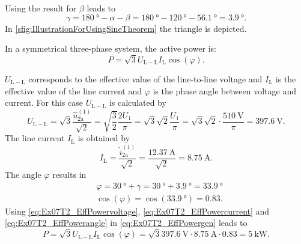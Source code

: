 \begin{solutionblock}
    Using the result for $\beta$ leads to
    \begin{equation}
        \gamma=\SI{180}{\degree}-\alpha-\beta = \SI{180}{\degree}-\SI{120}{\degree}-\SI{56.1}{\degree}= \SI{3.9}{\degree}.
        \label{eq:Ex07T2_sin_beta}
    \end{equation}
    In \autoref{sfig:IllustrationForUsingSineTheorem} the triangle is depicted.
    
    In a symmetrical three-phase system, the active power is:
    \begin{equation}
        P=\sqrt{3} U_{\mathrm{L-L}} I_{\mathrm{L}} \cos(\varphi).
        \label{eq:Ex07T2_EffPowergen}
    \end{equation}

    $U_{\mathrm{L-L}}$ corresponds to the effective value of the line-to-line voltage and $I_{\mathrm{L}}$ is the effective value
    of the line current and $\varphi$ is the phase angle between voltage and current. For this case $U_{\mathrm{L-L}}$ is calculated by
    \begin{equation}
        U_{\mathrm{L-L}}=\sqrt{3}\frac{\hat{u}_\mathrm{2a}^\mathrm{(1)}}{\sqrt{2}}
        = \sqrt{\frac{3}{2}} \frac{2U_\mathrm{1}}{\pi} = \sqrt{3}\sqrt{2}\frac{U_\mathrm{1}}{\pi}
        = \sqrt{3}\sqrt{2} \cdot \frac{\SI{510}{\volt}}{\pi}=\SI{397.6}{\volt}.
        \label{eq:Ex07T2_EffPowervoltage}
    \end{equation}
    The line current $I_{\mathrm{L}}$ is obtained by
    \begin{equation}
        I_{\mathrm{L}}=\frac{\hat{i}_\mathrm{2a}^\mathrm{(1)}}{\sqrt{2}}
        = \frac{\SI{12.37}{\ampere}}{\sqrt{2}}=\SI{8.75}{\ampere}.
        \label{eq:Ex07T2_EffPowercurrent}
    \end{equation}    
    The angle $\varphi$ results in
    \begin{equation}
        \begin{split}        
            &\varphi=\SI{30}{\degree}+ \gamma= \SI{30}{\degree}+\SI{3.9}{\degree}= \SI{33.9}{\degree} \\
            &\cos(\varphi)=\cos(\SI{33.9}{\degree})=0.83.
        \end{split}          
        \label{eq:Ex07T2_EffPowerangle}
    \end{equation}
    Using \eqref{eq:Ex07T2_EffPowervoltage},  \eqref{eq:Ex07T2_EffPowercurrent} and  \eqref{eq:Ex07T2_EffPowerangle}
    in \eqref{eq:Ex07T2_EffPowergen} leads to
    \begin{equation}
        P=\sqrt{3} U_{\mathrm{L-L}} I_{\mathrm{L}} \cos(\varphi)
        = \sqrt{3} \SI{397.6}{\volt} \cdot \SI{8.75}{\ampere} \cdot 0.83= \SI{5}{\kilo\watt}.
    \end{equation}
\end{solutionblock}
